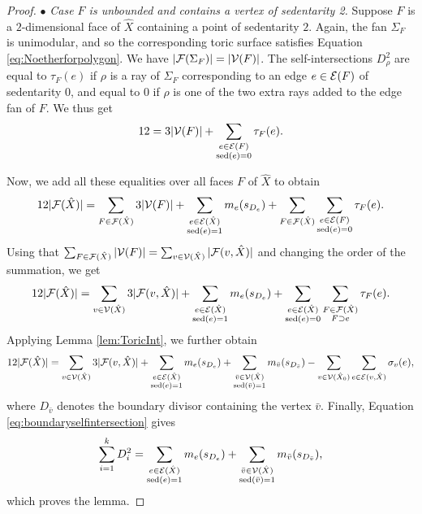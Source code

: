 \begin{proof}
$\bullet$ {\em Case $F$ is unbounded and contains a vertex of sedentarity 2.}
Suppose $F$ is a $2$-dimensional face of $\hat X$ containing a point of sedentarity $2$. 
Again, the fan $\Sigma_F$ is unimodular, and so the corresponding toric surface satisfies Equation \eqref{eq:Noetherforpolygon}. We have $|{\mathcal F}(\Sigma_F)|=|{\mathcal V}(F)|$. 
The self-intersections $D_{\rho}^2$ are equal to $\tau_F(e)$ if $\rho$ is a ray of $\Sigma_F$ corresponding to an edge $e \in {{\mathcal E}}(F)$ of sedentarity 0, 
and equal to $0$ if $\rho$ is one of the two extra rays added to the edge fan of $F$.
We thus get
\begin{equation*}\label{eq:noethersed2}
12 = 3 |{{\mathcal V}}(F)|  + \sum_{\substack{e \in {{\mathcal E}}(F)\\ \operatorname{sed}(e)=0}} \tau_F(e).
\end{equation*}

Now, we add all these equalities over all faces $F$ of $\hat X$ to obtain
$$12|{{\mathcal F}}(\hat{X})| =  \sum_{F \in {{\mathcal F}}(\hat{X})}  3|{{\mathcal V}}(F)| + \sum_{\substack{e \in {\mathcal E}(\hat{X})  \\ \operatorname{sed}(e) = 1}} m_e(s_{D_e}) + \sum_{\substack{F \in {\mathcal F}(\hat{X})}} \sum_{\substack{e \in {\mathcal E}(F) \\ \operatorname{sed}(e) = 0}}   \tau_{F}(e).$$
Using that $\sum_{F \in {{\mathcal F}}(\hat{X})}  |{{\mathcal V}}(F)| = \sum_{v \in {{\mathcal V}}(\hat{X})}  |{{\mathcal F}}(v, \hat{X})|$ and changing the order of the summation, we get
$$12|{{\mathcal F}}(\hat{X})| =  \sum_{v \in {{\mathcal V}}(\hat{X})}  3|{{\mathcal F}}(v, \hat{X})| +  \sum_{\substack{e \in {\mathcal E}(\hat{X})  \\ \operatorname{sed}(e) = 1}} m_e(s_{D_e}) + \sum_{\substack{e \in {\mathcal E}(\hat{X}) \\ \operatorname{sed}(e) = 0}} \sum_{\substack{F \in {\mathcal F}(\hat{X}) \\ F \supset e}}  \tau_{F}(e).$$
Applying Lemma \ref{lem:ToricInt}, we further obtain
$$12|{{\mathcal F}}(\hat{X})| =  \sum_{v \in {{\mathcal V}}(\hat{X})}  3|{{\mathcal F}}(v, \hat{X})|+   \sum_{\substack{e \in {\mathcal E}(\hat{X})  \\ \operatorname{sed}(e) = 1}} m_e(s_{D_e})  + \sum_{\substack{\bar{v} \in {\mathcal V}(\hat{X}) \\ \operatorname{sed}(\bar{v}) = 1}} m_{\bar{v}}(s_{D_{\bar v}}) - \sum_{v \in {{\mathcal V}}(\hat{X}_0)}\sum_{e \in {{\mathcal E}}(v, \hat{X})} \sigma_v(e),$$
where $D_{\bar v}$ denotes the boundary divisor containing the vertex $\bar v$.
Finally, Equation \eqref{eq:boundaryselfintersection} gives
$$\sum_{i = 1}^k D_i^2 = \sum_{\substack{e \in {\mathcal E}(\hat{X})  \\ \operatorname{sed}(e) = 1}} m_{e}(s_{D_e})+  \sum_{\substack{\bar{v} \in {\mathcal V}(\hat{X}) \\ \operatorname{sed}(\bar{v}) = 1}} m_{\bar{v}}(s_{D_{\bar v}}),$$
which proves the lemma.  
\end{proof}



